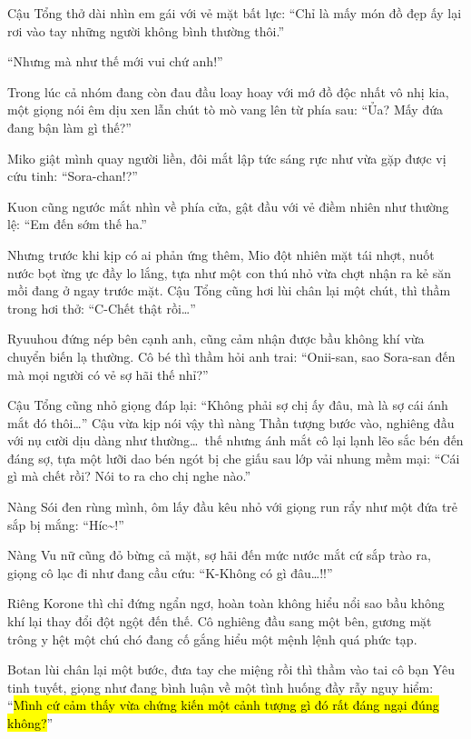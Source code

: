 \documentclass[../main.tex]{subfiles}
\begin{document}
Cậu Tổng thở dài nhìn em gái với vẻ mặt bất lực: ``Chỉ là mấy món đồ đẹp ấy lại rơi vào tay những người không bình thường thôi.''

``Nhưng mà như thế mới vui chứ anh!''

Trong lúc cả nhóm đang còn đau đầu loay hoay với mớ đồ độc nhất vô nhị kia, một giọng nói êm dịu xen lẫn chút tò mò vang lên từ phía sau: ``Ủa? Mấy đứa đang bận làm gì thế?''

Miko giật mình quay người liền, đôi mắt lập tức sáng rực như vừa gặp được vị cứu tinh: ``Sora-chan!?''

Kuon cũng ngước mắt nhìn về phía cửa, gật đầu với vẻ điềm nhiên như thường lệ: ``Em đến sớm thế ha.''

Nhưng trước khi kịp có ai phản ứng thêm, Mio đột nhiên mặt tái nhợt, nuốt nước bọt ừng ực đầy lo lắng, tựa như một con thú nhỏ vừa chợt nhận ra kẻ săn mồi đang ở ngay trước mặt. Cậu Tổng cũng hơi lùi chân lại một chút, thì thầm trong hơi thở: ``C-Chết thật rồi\dots''

Ryuuhou đứng nép bên cạnh anh, cũng cảm nhận được bầu không khí vừa chuyển biến lạ thường. Cô bé thì thầm hỏi anh trai: ``Onii-san, sao Sora-san đến mà mọi người có vẻ sợ hãi thế nhỉ?''

Cậu Tổng cũng nhỏ giọng đáp lại: ``Không phải sợ chị ấy đâu, mà là sợ cái ánh mắt đó thôi\dots'' Cậu vừa kịp nói vậy thì nàng Thần tượng bước vào, nghiêng đầu với nụ cười dịu dàng như thường\dots\ thế nhưng ánh mắt cô lại lạnh lẽo sắc bén đến đáng sợ, tựa một lưỡi dao bén ngót bị che giấu sau lớp vải nhung mềm mại: ``Cái gì mà chết rồi? Nói to ra cho chị nghe nào.''


Nàng Sói đen rùng mình, ôm lấy đầu kêu nhỏ với giọng run rẩy như một đứa trẻ sắp bị mắng: ``Híc\~{}!''

Nàng Vu nữ cũng đỏ bừng cả mặt, sợ hãi đến mức nước mắt cứ sắp trào ra, giọng cô lạc đi như đang cầu cứu: ``K-Không có gì đâu\dots!!''

Riêng Korone thì chỉ đứng ngẩn ngơ, hoàn toàn không hiểu nổi sao bầu không khí lại thay đổi đột ngột đến thế. Cô nghiêng đầu sang một bên, gương mặt trông y hệt một chú chó đang cố gắng hiểu một mệnh lệnh quá phức tạp.

Botan lùi chân lại một bước, đưa tay che miệng rồi thì thầm vào tai cô bạn Yêu tinh tuyết, giọng như đang bình luận về một tình huống đầy rẫy nguy hiểm: ``\hl{Mình cứ cảm thấy vừa chứng kiến một cảnh tượng gì đó rất đáng ngại đúng không?}''
\end{document}
